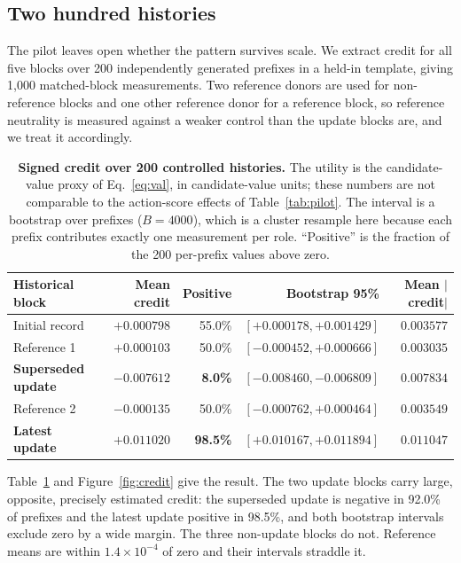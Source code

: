 \documentclass{article}
\begin{document}
\subsection{Two hundred histories}

The pilot leaves open whether the pattern survives scale. We extract credit for
all five blocks over 200 independently generated prefixes in a held-in template,
giving 1{,}000 matched-block measurements. Two reference donors are used for
non-reference blocks and one other reference donor for a reference block, so
reference neutrality is measured against a weaker control than the update blocks
are, and we treat it accordingly.

\begin{table}[tbp]
\caption{\textbf{Signed credit over 200 controlled histories.} The utility is
the candidate-value proxy of Eq.~\eqref{eq:val}, in candidate-value units;
these numbers are not comparable to the action-score effects of
Table~\ref{tab:pilot}. The interval is a bootstrap over prefixes ($B=4000$),
which is a cluster resample here because each prefix contributes exactly one
measurement per role. ``Positive'' is the fraction of the 200 per-prefix values
above zero.}
\label{tab:credit}
\centering
\small
\begin{tabular}{lrrrr}
\toprule
Historical block & Mean credit & Positive & Bootstrap 95\% & Mean $|$credit$|$\\
\midrule
Initial record       & $+0.000798$ & 55.0\% & $[+0.000178, +0.001429]$ & $0.003577$\\
Reference 1          & $+0.000103$ & 50.0\% & $[-0.000452, +0.000666]$ & $0.003035$\\
\textbf{Superseded update} & $\mathbf{-0.007612}$ & \textbf{8.0\%} & $[-0.008460, -0.006809]$ & $0.007834$\\
Reference 2          & $-0.000135$ & 50.0\% & $[-0.000762, +0.000464]$ & $0.003549$\\
\textbf{Latest update}     & $\mathbf{+0.011020}$ & \textbf{98.5\%} & $[+0.010167, +0.011894]$ & $0.011047$\\
\bottomrule
\end{tabular}
\end{table}

Table~\ref{tab:credit} and Figure~\ref{fig:credit} give the result. The two
update blocks carry large, opposite, precisely estimated credit: the superseded
update is negative in 92.0\% of prefixes and the latest update positive in
98.5\%, and both bootstrap intervals exclude zero by a wide margin. The three
non-update blocks do not. Reference means are within $1.4\times10^{-4}$ of zero
and their intervals straddle it.
\end{document}
